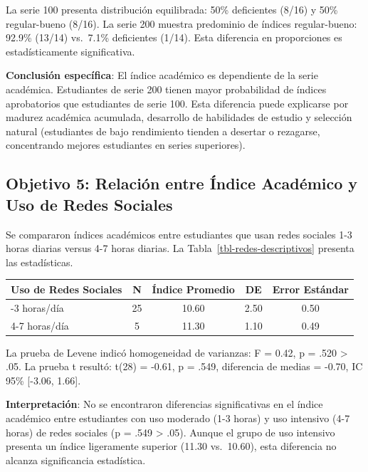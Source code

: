 \documentclass[
  stu,
  floatsintext,
  longtable,
  a4paper,
  nolmodern,
  notxfonts,
  notimes,
  12pt,
  colorlinks=true,linkcolor=blue,citecolor=blue,urlcolor=blue]{apa7}
\newcounter{none} %
\begin{document}
La serie 100 presenta distribución equilibrada: 50\% deficientes (8/16)
y 50\% regular-bueno (8/16). La serie 200 muestra predominio de índices
regular-bueno: 92.9\% (13/14) vs.~7.1\% deficientes (1/14). Esta
diferencia en proporciones es estadísticamente significativa.

\textbf{Conclusión específica}: El índice académico es dependiente de la
serie académica. Estudiantes de serie 200 tienen mayor probabilidad de
índices aprobatorios que estudiantes de serie 100. Esta diferencia puede
explicarse por madurez académica acumulada, desarrollo de habilidades de
estudio y selección natural (estudiantes de bajo rendimiento tienden a
desertar o rezagarse, concentrando mejores estudiantes en series
superiores).

\subsection{Objetivo 5: Relación entre Índice Académico y Uso de Redes
Sociales}\label{objetivo-5-relaciuxf3n-entre-uxedndice-acaduxe9mico-y-uso-de-redes-sociales}

Se compararon índices académicos entre estudiantes que usan redes
sociales 1-3 horas diarias versus 4-7 horas diarias. La
Tabla~\ref{tbl-redes-descriptivos} presenta las estadísticas.

\begin{table}

{\caption{{Estadísticas Descriptivas del Índice según Uso de Redes
Sociales}{\label{tbl-redes-descriptivos}}}}

{\def\LTcaptype{none} %
\begin{longtable}[]{@{}lcccc@{}}
\toprule\noalign{}
Uso de Redes Sociales & N & Índice Promedio & DE & Error Estándar \\
\midrule\noalign{}
\endhead
\bottomrule\noalign{}
\endlastfoot
1-3 horas/día & 25 & 10.60 & 2.50 & 0.50 \\
4-7 horas/día & 5 & 11.30 & 1.10 & 0.49 \\
\end{longtable}
}

\end{table}

La prueba de Levene indicó homogeneidad de varianzas: F = 0.42, p = .520
\textgreater{} .05. La prueba t resultó: t(28) = -0.61, p = .549,
diferencia de medias = -0.70, IC 95\% {[}-3.06, 1.66{]}.

\textbf{Interpretación}: No se encontraron diferencias significativas en
el índice académico entre estudiantes con uso moderado (1-3 horas) y uso
intensivo (4-7 horas) de redes sociales (p = .549 \textgreater{} .05).
Aunque el grupo de uso intensivo presenta un índice ligeramente superior
(11.30 vs.~10.60), esta diferencia no alcanza significancia estadística.
\end{document}
